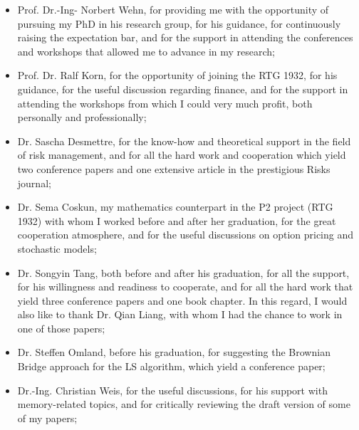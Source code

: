 \begin{itemize}
	\vspace{-2mm}
	\item Prof. Dr.-Ing- Norbert Wehn, for providing me with the opportunity of pursuing my PhD in his research group, for his guidance, for continuously raising the expectation bar, and for the support in attending the conferences and workshops that allowed me to advance in my research;

	\vspace{-2mm}
	\item Prof. Dr. Ralf Korn, for the opportunity of joining the RTG 1932, for his guidance, for the useful discussion regarding finance, and for the support in attending the workshops from which I could very much profit, both personally and professionally;

	\vspace{-2mm}
	\item Dr. Sascha Desmettre, for the know-how and theoretical support in the field of risk management, and for all the hard work and cooperation which yield two conference papers and one extensive article in the prestigious Risks journal;

	\vspace{-2mm}
	\item Dr. Sema Coskun, my mathematics counterpart in the P2 project (RTG 1932) with whom I worked before and after her graduation, for the great cooperation atmosphere, and for the useful discussions on option pricing and stochastic models;

	\vspace{-2mm}
	\item Dr. Songyin Tang, both before and after his graduation, for all the support, for his willingness and readiness to cooperate, and for all the hard work that yield three conference papers and one book chapter.
In this regard, I would also like to thank Dr. Qian Liang, with whom I had the chance to work in one of those papers;

	\vspace{-2mm}
	\item Dr. Steffen Omland, before his graduation, for suggesting the Brownian Bridge approach for the \acrlong{LS} algorithm, which yield a  conference paper;

	\vspace{-2mm}
	\item Dr.-Ing. Christian Weis, for the useful discussions, for his support with memory-related topics, and for critically reviewing the draft version of some of my papers;


\end{itemize}
